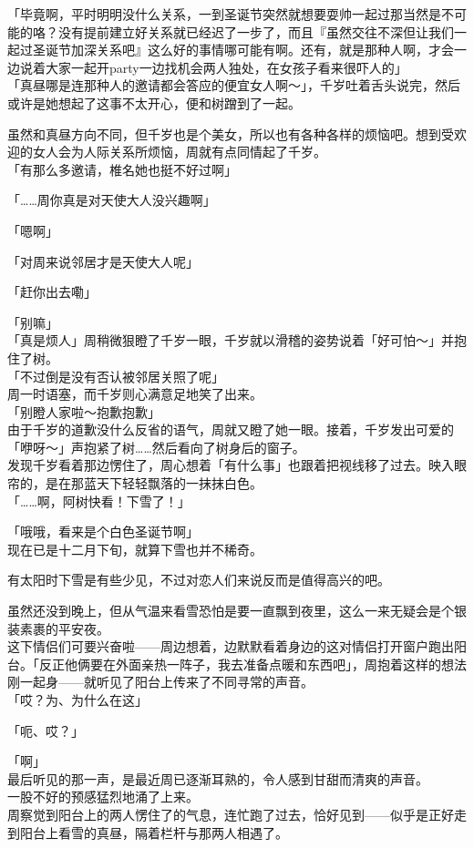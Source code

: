 「毕竟啊，平时明明没什么关系，一到圣诞节突然就想要耍帅一起过那当然是不可能的咯？没有提前建立好关系就已经迟了一步了，而且『虽然交往不深但让我们一起过圣诞节加深关系吧』这么好的事情哪可能有啊。还有，就是那种人啊，才会一边说着大家一起开party一边找机会两人独处，在女孩子看来很吓人的」\\

「真昼哪是连那种人的邀请都会答应的便宜女人啊～」，千岁吐着舌头说完，然后或许是她想起了这事不太开心，便和树蹭到了一起。

虽然和真昼方向不同，但千岁也是个美女，所以也有各种各样的烦恼吧。想到受欢迎的女人会为人际关系所烦恼，周就有点同情起了千岁。\\

「有那么多邀请，椎名她也挺不好过啊」

「……周你真是对天使大人没兴趣啊」

「嗯啊」

「对周来说邻居才是天使大人呢」

「赶你出去嘞」

「别嘛」\\

「真是烦人」周稍微狠瞪了千岁一眼，千岁就以滑稽的姿势说着「好可怕～」并抱住了树。\\

「不过倒是没有否认被邻居关照了呢」\\

周一时语塞，而千岁则心满意足地笑了出来。\\

「别瞪人家啦～抱歉抱歉」\\

由于千岁的道歉没什么反省的语气，周就又瞪了她一眼。接着，千岁发出可爱的「咿呀～」声抱紧了树……然后看向了树身后的窗子。\\

发现千岁看着那边愣住了，周心想着「有什么事」也跟着把视线移了过去。映入眼帘的，是在那蓝天下轻轻飘落的一抹抹白色。\\

「……啊，阿树快看！下雪了！」

「哦哦，看来是个白色圣诞节啊」\\

现在已是十二月下旬，就算下雪也并不稀奇。

有太阳时下雪是有些少见，不过对恋人们来说反而是值得高兴的吧。

虽然还没到晚上，但从气温来看雪恐怕是要一直飘到夜里，这么一来无疑会是个银装素裹的平安夜。\\

这下情侣们可要兴奋啦——周边想着，边默默看着身边的这对情侣打开窗户跑出阳台。「反正他俩要在外面亲热一阵子，我去准备点暖和东西吧」，周抱着这样的想法刚一起身——就听见了阳台上传来了不同寻常的声音。\\

「哎？为、为什么在这」

「呃、哎？」

「啊」\\

最后听见的那一声，是最近周已逐渐耳熟的，令人感到甘甜而清爽的声音。\\

一股不好的预感猛烈地涌了上来。\\

周察觉到阳台上的两人愣住了的气息，连忙跑了过去，恰好见到——似乎是正好走到阳台上看雪的真昼，隔着栏杆与那两人相遇了。
